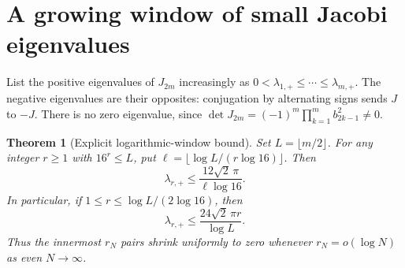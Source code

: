\documentclass[10pt]{article}
\newtheorem{theorem}{Theorem}
\begin{document}
\section{A growing window of small Jacobi eigenvalues}
List the positive eigenvalues of $J_{2m}$ increasingly as
$0<\lambda_{1,+}\le\cdots\le\lambda_{m,+}$. The negative eigenvalues
are their opposites: conjugation by alternating signs sends $J$ to $-J$.
There is no zero eigenvalue, since
$\det J_{2m}=(-1)^m\prod_{k=1}^m b_{2k-1}^2\ne0$.
\begin{theorem}[Explicit logarithmic-window bound]
Set $L=\lfloor m/2\rfloor$. For any integer $r\ge1$ with $16^r\le L$,
put $\ell=\lfloor\log L/(r\log16)\rfloor$. Then
\begin{equation}
\lambda_{r,+}\le\frac{12\sqrt2\,\pi}{\ell\log16}.
\label{eq:packetbound}
\end{equation}
In particular, if $1\le r\le\log L/(2\log16)$, then
\begin{equation}
\boxed{\quad\lambda_{r,+}\le
\frac{24\sqrt2\,\pi r}{\log L}.\quad}\label{eq:logbound}
\end{equation}
Thus the innermost $r_N$ pairs shrink uniformly to zero whenever
$r_N=o(\log N)$ as even $N\to\infty$.
\end{theorem}
\end{document}
